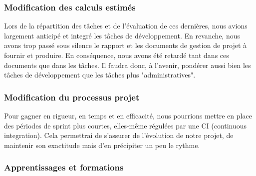 \documentclass[a4paper, 12pt]{report}
\begin{document}
\subsubsection*{Modification des calculs estimés}
Lors de la répartition des tâches et de l'évaluation de ces dernières, nous avions largement anticipé et integré les tâches de développement. En revanche, nous avons trop passé sous silence le rapport et les documents de gestion de projet à fournir et produire. En conséquence, nous avons été retardé tant dans ces documents que dans les tâches.
Il faudra donc, à l'avenir, pondérer aussi bien les tâches de développement que les tâches plus "administratives".

\subsubsection*{Modification du processus projet}
Pour gagner en rigueur, en temps et en efficacité, nous pourrions mettre en place des périodes de sprint plus courtes, elles-même régulées par une CI (continuous integration). Cela permettrai de s'assurer de l'évolution de notre projet, de maintenir son exactitude mais d'en précipiter un peu le rythme.

\subsubsection*{Apprentissages et formations}
\end{document}
